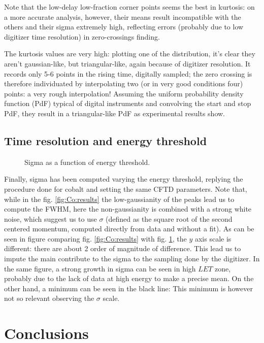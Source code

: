 \documentclass[11pt,a4 paper]{article}
\begin{document}
Note that the low-delay low-fraction corner points seems the best in kurtosis: on a more accurate analysis, however, their means result incompatible with the others and their sigma extremely high, reflecting errors (probably due to low digitizer time resolution) in zero-crossings finding.

The kurtosis values are very high: plotting one of the distribution, it's clear they aren't gaussian-like, but triangular-like, again because of digitizer resolution. It records only 5-6 points in the rising time, digitally sampled; the zero crossing is therefore individuated by interpolating two (or in very good conditions four) points: a very rough interpolation! Assuming the uniform probability density function (PdF) typical of digital instruments and convolving the start and stop PdF, they result in a triangular-like PdF as experimental results show.

\subsection{Time resolution and energy threshold}

\begin{figure}[H]
    \centering
    \caption{Sigma as a function of energy threshold.}
    \label{fig:sigma:sim}
\end{figure}


Finally, sigma has been computed varying the energy threshold, replying the procedure done for cobalt and setting the same CFTD parameters. Note that, while in the fig. \ref{fig:Co:results} the low-gaussianity of the peaks lead us to compute the FWHM, here the non-gaussianity is combined with a strong white noise, which suggest us to use $\sigma$ (defined as the square root of the second centered momentum, computed directly from data and without a fit). As can be seen in figure comparing fig. \ref{fig:Co:results} with fig. \ref{fig:sigma:sim}, the $y$ axis scale is different: there are about 2 order of magnitude of difference. This lead us to impute the main contribute to the sigma to the sampling done by the digitizer. In the same figure, a strong growth in sigma can be seen in high $LET$ zone, probably due to the lack of data at high energy to make a precise mean. On the other hand, a minimum can be seen in the black line: This minimum is however not so relevant observing the $\sigma$ scale.

\section{Conclusions}
\end{document}

